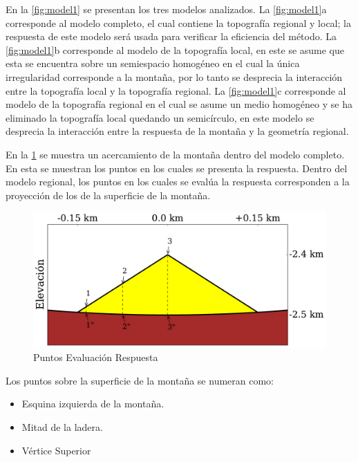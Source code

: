 \documentclass[spanish,letterpaper,12pt,twoside,openany]{article}
\begin{document}
En la \cref{fig:model1} se presentan los tres modelos analizados. La \cref{fig:model1}a corresponde al modelo completo, el cual contiene la topografía regional y local; la respuesta de este modelo será usada para verificar la eficiencia del método. La \cref{fig:model1}b corresponde al modelo de la topografía local, en este se asume que esta se encuentra sobre un semiespacio homogéneo en el cual la única irregularidad corresponde a la montaña, por lo tanto se desprecia la interacción entre la topografía local y la topografía regional. La \cref{fig:model1}c corresponde al modelo de la topografía regional en el cual se asume un medio homogéneo y se ha eliminado la topografía local quedando un semicírculo, en este modelo se desprecia la interacción entre la respuesta de la montaña y la geometría regional. 

En la \cref{fig:puntos} se muestra un acercamiento de la montaña dentro del modelo completo. En esta se muestran los puntos en los cuales se presenta la respuesta. Dentro del modelo regional, los puntos en los cuales se evalúa la respuesta corresponden a la proyección de los de la superficie de la montaña.

\begin{figure}[H]
	\centering
	\includegraphics[width=12 cm]{img/ModelRegionalCompleteZoom.pdf}
	\vspace{-.5 cm}
	\caption{Puntos Evaluación Respuesta}
	\label{fig:puntos}
	\vspace{-1 cm}
\end{figure}
%

Los puntos sobre la superficie de la montaña se numeran como:
%
\begin{itemize}
%
	\item[1:] Esquina izquierda de la montaña.
	\vspace{-.5 cm}
	\item[2:] Mitad de la ladera.
	\vspace{-.5 cm}
	\item[3:] Vértice Superior
	\vspace{-.5 cm}
%
\end{itemize} 
\end{document}
